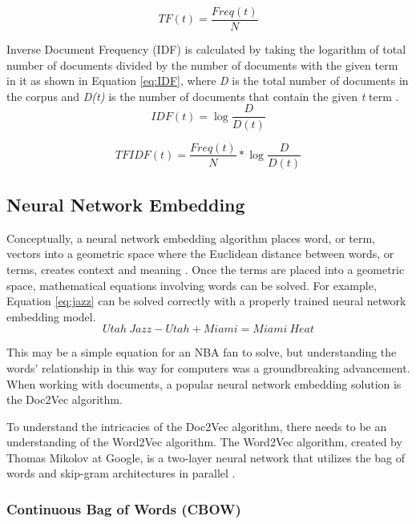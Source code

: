 \documentclass[5p,authoryear]{elsarticle}
\begin{document}
\begin{equation}
    TF(t) = \frac{Freq(t)}{N}\label{eq:TF}
\end{equation}

Inverse Document Frequency (IDF) is calculated by taking the logarithm of total number of documents divided by the number of documents with the given term in it as shown in Equation \ref{eq:IDF}, where \textit{D} is the total number of documents in the corpus and \textit{D(t)} is the number of documents that contain the given \textit{t} term \citep{mining}. 
\begin{equation}
    IDF(t) = \log{\frac{D}{D(t)}}\label{eq:IDF}
\end{equation}

\begin{equation}
    TFIDF(t) = \frac{Freq(t)}{N} * \log{\frac{D}{D(t)}}\label{eq:TFIDF}
\end{equation}



\subsection{Neural Network Embedding}\label{Doc2Vec}

Conceptually, a neural network embedding algorithm places word, or term, vectors into a geometric space where the Euclidean distance between words, or terms, creates context and meaning \citep{chollet}. 
Once the terms are placed into a geometric space, mathematical equations involving words can be solved. 
For example, Equation \ref{eq:jazz} can be solved correctly with a properly trained neural network embedding model.
\begin{equation}
Utah\ Jazz - Utah + Miami = Miami\ Heat \label{eq:jazz}
\end{equation}

This may be a simple equation for an NBA fan to solve, but understanding the words’ relationship in this way for computers was a groundbreaking advancement. 
When working with documents, a popular neural network embedding solution is the Doc2Vec algorithm. 

To understand the intricacies of the Doc2Vec algorithm, there needs to be an understanding of the Word2Vec algorithm. 
The Word2Vec algorithm, created by Thomas Mikolov at Google, is a two-layer neural network that utilizes the bag of words and skip-gram architectures in parallel \citep{google}.


\subsubsection{Continuous Bag of Words (CBOW)}\label{Doc2Vec}
\end{document}
